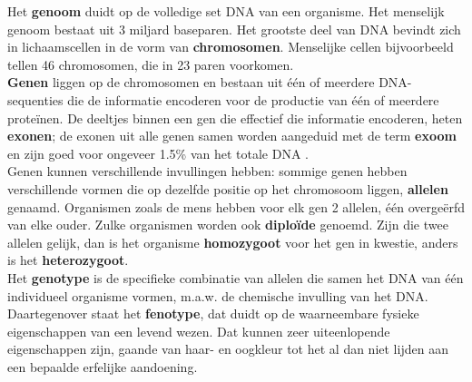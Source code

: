 Het \textbf{genoom} duidt op de volledige set DNA van een organisme. Het menselijk genoom bestaat uit 3 miljard baseparen. Het grootste deel van DNA bevindt zich in lichaamscellen in de vorm van \textbf{chromosomen}. Menselijke cellen bijvoorbeeld tellen 46 chromosomen, die in 23 paren voorkomen.\\
\textbf{Genen} liggen op de chromosomen en bestaan uit \'e\'en of meerdere DNA-sequenties die de informatie encoderen voor de productie van \'e\'en of meerdere prote\"inen. De deeltjes binnen een gen die effectief die informatie encoderen, heten \textbf{exonen}; de exonen uit alle genen samen worden aangeduid met de term \textbf{exoom} en zijn goed voor ongeveer 1.5\% van het totale DNA \cite{broad_exome}.\\
Genen kunnen verschillende invullingen hebben: sommige genen hebben verschillende vormen die op dezelfde positie op het chromosoom liggen, \textbf{allelen} genaamd. Organismen zoals de mens hebben voor elk gen 2 allelen, \'e\'en overge\"erfd van elke ouder. Zulke organismen worden ook \textbf{diplo\"ide} genoemd. Zijn die twee allelen gelijk, dan is het organisme \textbf{homozygoot} voor het gen in kwestie, anders is het \textbf{heterozygoot}.\\
Het \textbf{genotype} is de specifieke combinatie van allelen die samen het DNA van \'e\'en individueel organisme vormen, m.a.w. de chemische invulling van het DNA. Daartegenover staat het \textbf{fenotype}, dat duidt op de waarneembare fysieke eigenschappen van een levend wezen. Dat kunnen zeer uiteenlopende eigenschappen zijn, gaande van haar- en oogkleur tot het al dan niet lijden aan een bepaalde erfelijke aandoening.\\

